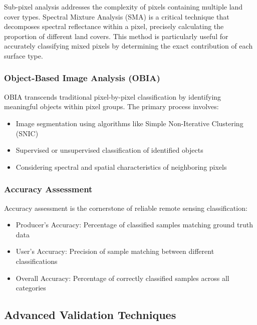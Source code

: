 \documentclass[
  letterpaper,
]{scrbook}
\begin{document}
Sub-pixel analysis addresses the complexity of pixels containing
multiple land cover types. Spectral Mixture Analysis (SMA) is a critical
technique that decomposes spectral reflectance within a pixel, precisely
calculating the proportion of different land covers. This method is
particularly useful for accurately classifying mixed pixels by
determining the exact contribution of each surface type.

\subsubsection{Object-Based Image Analysis
(OBIA)}\label{object-based-image-analysis-obia}

OBIA transcends traditional pixel-by-pixel classification by identifying
meaningful objects within pixel groups. The primary process involves:

\begin{itemize}
\item
  Image segmentation using algorithms like Simple Non-Iterative
  Clustering (SNIC)
\item
  Supervised or unsupervised classification of identified objects
\item
  Considering spectral and spatial characteristics of neighboring pixels
\end{itemize}

\subsubsection{Accuracy Assessment}\label{accuracy-assessment-1}

Accuracy assessment is the cornerstone of reliable remote sensing
classification:

\begin{itemize}
\item
  Producer's Accuracy: Percentage of classified samples matching ground
  truth data
\item
  User's Accuracy: Precision of sample matching between different
  classifications
\item
  Overall Accuracy: Percentage of correctly classified samples across
  all categories
\end{itemize}

\subsection{Advanced Validation
Techniques}\label{advanced-validation-techniques}
\end{document}

